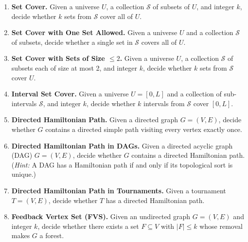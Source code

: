 \documentclass[9pt]{book}
\begin{document}
\begin{enumerate}[label=\arabic*.]
\item \textbf{Set Cover.}
Given a universe $U$, a collection $\mathcal{S}$ of subsets of $U$, and integer $k$, decide whether $k$ sets from $\mathcal{S}$ cover all of $U$.

\bigskip

\item \textbf{Set Cover with One Set Allowed.}
Given a universe $U$ and a collection $\mathcal{S}$ of subsets, decide whether a single set in $\mathcal{S}$ covers all of $U$.

\bigskip

\item \textbf{Set Cover with Sets of Size $\leq 2$.}
Given a universe $U$, a collection $\mathcal{S}$ of subsets each of size at most 2, and integer $k$, decide whether $k$ sets from $\mathcal{S}$ cover $U$.

\bigskip

\item \textbf{Interval Set Cover.}
Given a universe $U=[0,L]$ and a collection of sub-intervals $\mathcal{S}$, and integer $k$, decide whether $k$ intervals from $\mathcal{S}$ cover $[0,L]$.

\bigskip

\item \textbf{Directed Hamiltonian Path.}
Given a directed graph $G=(V,E)$, decide whether $G$ contains a directed simple path visiting every vertex exactly once.

\bigskip

\item \textbf{Directed Hamiltonian Path in DAGs.}
Given a directed acyclic graph (DAG) $G=(V,E)$, decide whether $G$ contains a directed Hamiltonian path.
(\textit{Hint:} A DAG has a Hamiltonian path if and only if its topological sort is unique.)

\bigskip

\item \textbf{Directed Hamiltonian Path in Tournaments.}
Given a tournament $T=(V,E)$, decide whether $T$ has a directed Hamiltonian path.

\bigskip

\item \textbf{Feedback Vertex Set (FVS).}
Given an undirected graph $G=(V,E)$ and integer $k$, decide whether there exists a set $F\subseteq V$ with $|F|\leq k$ whose removal makes $G$ a forest.

\bigskip


\end{enumerate}
\end{document}
